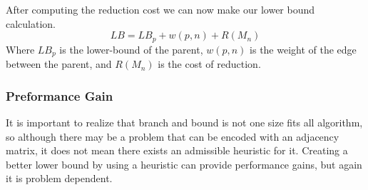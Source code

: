     After computing the reduction cost we can now make our lower bound calculation.
    \begin{equation}
        LB = LB_p + w(p, n) + R(M_n)
    \end{equation}
    Where $LB_p$ is the lower-bound of the parent, $w(p, n)$ is the weight of the edge
    between the parent, and $R(M_n)$ is the cost of reduction.\\

    \subsubsection{Preformance Gain}
    It is important to realize that branch and bound is not one size fits all algorithm, so
    although there may be a problem that can be encoded with an adjacency matrix, it does not mean
    there exists an admissible heuristic for it. Creating a better lower bound by using a heuristic
    can provide performance gains, but again it is problem dependent.


